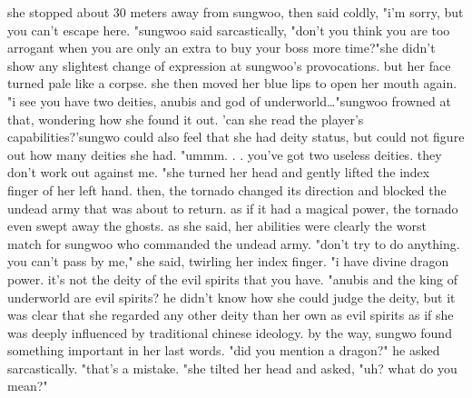 she stopped about 30 meters away from sungwoo, then said coldly, "i'm sorry, but you can't escape here.
"sungwoo said sarcastically, "don't you think you are too arrogant when you are only an extra to buy your boss more time?"she didn't show any slightest change of expression at sungwoo's provocations.
 but her face turned pale like a corpse.
she then moved her blue lips to open her mouth again.
"i see you have two deities, anubis and god of underworld…"sungwoo frowned at that, wondering how she found it out.
'can she read the player's capabilities?'sungwo could also feel that she had deity status, but could not figure out how many deities she had.
"ummm.
.
.
you've got two useless deities.
 they don't work out against me.
"she turned her head and gently lifted the index finger of her left hand.
 then, the tornado changed its direction and blocked the undead army that was about to return.
as if it had a magical power, the tornado even swept away the ghosts.
as she said, her abilities were clearly the worst match for sungwoo who commanded the undead army.
"don't try to do anything.
 you can't pass by me," she said, twirling her index finger.
"i have divine dragon power.
 it's not the deity of the evil spirits that you have.
"anubis and the king of underworld are evil spirits? he didn't know how she could judge the deity, but it was clear that she regarded any other deity than her own as evil spirits as if she was deeply influenced by traditional chinese ideology.
by the way, sungwo found something important in her last words.
"did you mention a dragon?" he asked sarcastically.
 "that's a mistake.
"she tilted her head and asked, "uh? what do you mean?"

 